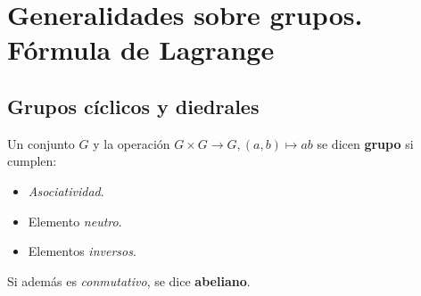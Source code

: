 \chapter{Generalidades sobre grupos.\\ Fórmula de Lagrange}
\section{Grupos cíclicos y diedrales}

\begin{defi}
Un conjunto $G$ y la operación $G \times G \rightarrow G, \left( a, b \right) \mapsto ab$ se dicen \textbf{grupo} si cumplen:
\begin{itemize}
    \item \textit{Asociatividad}.
    \item Elemento \textit{neutro}.
    \item Elementos \textit{inversos}.
\end{itemize}
Si además es \textit{conmutativo}, se dice \textbf{abeliano}.
\end{defi}

